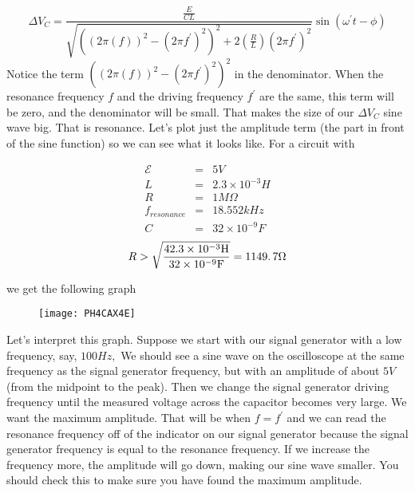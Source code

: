 \begin{equation*}
\Delta V_{C}=\frac{\frac{E}{CL}}{\sqrt{\left( \left( 2\pi \left( f\right)
\right) ^{2}-\left( 2\pi f^{\prime }\right) ^{2}\right) ^{2}+2\left( \frac{R%
}{L}\right) \left( 2\pi f^{\prime }\right) ^{2}}}\sin \left( \omega ^{\prime
}t-\phi \right)
\end{equation*}%
Notice the term $\left( \left( 2\pi \left( f\right) \right) ^{2}-\left( 2\pi
f^{\prime }\right) ^{2}\right) ^{2}$ in the denominator. When the resonance
frequency $f$ and the driving frequency $f^{\prime }$ are the same, this
term will be zero, and the denominator will be small. That makes the size of
our $\Delta V_{C}$ sine wave big. That is resonance. Let's plot just the
amplitude term (the part in front of the sine function) so we can see what
it looks like. For a circuit with

\begin{eqnarray*}
\mathcal{E} &=&5\unit{V} \\
L &=&2.3\times 10^{-3}\unit{H} \\
R &=&1\unit{M%
\Omega%
} \\
f_{resonance} &=&18.552\unit{kHz} \\
C &=&32\times 10^{-9}\unit{F}
\end{eqnarray*}%
\begin{equation*}
R>\sqrt{\frac{42.3\times 10^{-3}\unit{H}}{32\times 10^{-9}\unit{F}}}%
=1149.\,\allowbreak 7\unit{%
\Omega%
}
\end{equation*}

we get the following graph

\begin{figure}[h!]
\texttt{[image: PH4CAX4E]}
\end{figure}Let's interpret this graph.
Suppose we start with our signal generator with a low frequency, say, $100%
\unit{Hz},$ We should see a sine wave on the oscilloscope at the same
frequency as the signal generator frequency, but with an amplitude of about $%
5\unit{V}$ (from the midpoint to the peak). Then we change the signal
generator driving frequency until the measured voltage across the capacitor
becomes very large. We want the maximum amplitude. That will be when $%
f=f^{\prime }$ and we can read the resonance frequency off of the indicator
on our signal generator because the signal generator frequency is equal to
the resonance frequency. If we increase the frequency more, the amplitude
will go down, making our sine wave smaller. You should check this to make
sure you have found the maximum amplitude.

